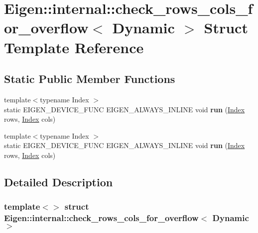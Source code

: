 \hypertarget{struct_eigen_1_1internal_1_1check__rows__cols__for__overflow_3_01_dynamic_01_4}{}\section{Eigen\+:\+:internal\+:\+:check\+\_\+rows\+\_\+cols\+\_\+for\+\_\+overflow$<$ Dynamic $>$ Struct Template Reference}
\label{struct_eigen_1_1internal_1_1check__rows__cols__for__overflow_3_01_dynamic_01_4}
\subsection*{Static Public Member Functions}
\begin{DoxyCompactItemize}
\item 
\mbox{\label{struct_eigen_1_1internal_1_1check__rows__cols__for__overflow_3_01_dynamic_01_4_a4483c7d8313821530752f5639014bb58}} 
{\footnotesize template$<$typename Index $>$ }\\static E\+I\+G\+E\+N\+\_\+\+D\+E\+V\+I\+C\+E\+\_\+\+F\+U\+NC E\+I\+G\+E\+N\+\_\+\+A\+L\+W\+A\+Y\+S\+\_\+\+I\+N\+L\+I\+NE void {\bfseries run} (\hyperlink{namespace_eigen_a62e77e0933482dafde8fe197d9a2cfde}{Index} rows, \hyperlink{namespace_eigen_a62e77e0933482dafde8fe197d9a2cfde}{Index} cols)
\item 
\mbox{\label{struct_eigen_1_1internal_1_1check__rows__cols__for__overflow_3_01_dynamic_01_4_a4483c7d8313821530752f5639014bb58}} 
{\footnotesize template$<$typename Index $>$ }\\static E\+I\+G\+E\+N\+\_\+\+D\+E\+V\+I\+C\+E\+\_\+\+F\+U\+NC E\+I\+G\+E\+N\+\_\+\+A\+L\+W\+A\+Y\+S\+\_\+\+I\+N\+L\+I\+NE void {\bfseries run} (\hyperlink{namespace_eigen_a62e77e0933482dafde8fe197d9a2cfde}{Index} rows, \hyperlink{namespace_eigen_a62e77e0933482dafde8fe197d9a2cfde}{Index} cols)
\end{DoxyCompactItemize}


\subsection{Detailed Description}
\subsubsection*{template$<$$>$\newline
struct Eigen\+::internal\+::check\+\_\+rows\+\_\+cols\+\_\+for\+\_\+overflow$<$ Dynamic $>$}




